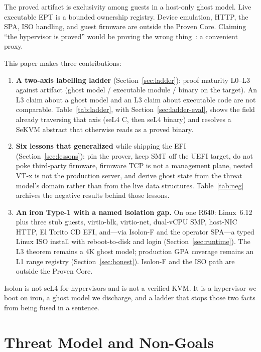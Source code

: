 \documentclass[sigplan,10pt,anonymous]{acmart}
\begin{document}
The proved artifact is exclusivity among guests in a host-only ghost
model. Live executable EPT is a bounded ownership registry. Device
emulation, HTTP, the SPA, ISO handling, and guest firmware are outside the
Proven Core. Claiming ``the hypervisor is proved'' would be proving the
wrong thing~\cite{klein2014comprehensive}: a convenient proxy.

This paper makes three contributions:

\begin{enumerate}
\item \textbf{A two-axis labelling ladder} (Section~\ref{sec:ladder}):
  proof maturity L0--L3 against artifact
  (ghost model / executable module / binary on the target). An L3 claim
  about a ghost model and an L3 claim about executable code are not
  comparable. Table~\ref{tab:ladder}, with Section~\ref{sec:ladder-eval},
  shows the field already traversing that axis (seL4 C, then seL4 binary)
  and resolves a SeKVM abstract that otherwise reads as a proved binary.

\item \textbf{Six lessons that generalized} while shipping the EFI
  (Section~\ref{sec:lessons}): pin the prover, keep SMT off the UEFI target,
  do not poke third-party firmware, firmware TCP is not a management plane,
  nested VT-x is not the production server, and derive ghost state from
  the threat model's domain rather than from the live data structures.
  Table~\ref{tab:neg} archives the negative results behind those lessons.

\item \textbf{An iron Type-1 with a named isolation gap.}
  On one R640: Linux~6.12 plus three stub guests, virtio-blk, virtio-net,
  dual-vCPU SMP, host-NIC HTTP, El Torito CD EFI, and---via Isolon-F and
  the operator SPA---a typed Linux ISO install with reboot-to-disk and
  login (Section~\ref{sec:runtime}). The L3 theorem remains a 4K ghost
  model; production GPA coverage remains an L1 range registry
  (Section~\ref{sec:honest}). Isolon-F and the ISO path are outside the
  Proven Core.
\end{enumerate}

Isolon is not seL4 for hypervisors and is not a verified KVM. It is a
hypervisor we boot on iron, a ghost model we discharge, and a ladder
that stops those two facts from being fused in a sentence.

\section{Threat Model and Non-Goals}
\end{document}
